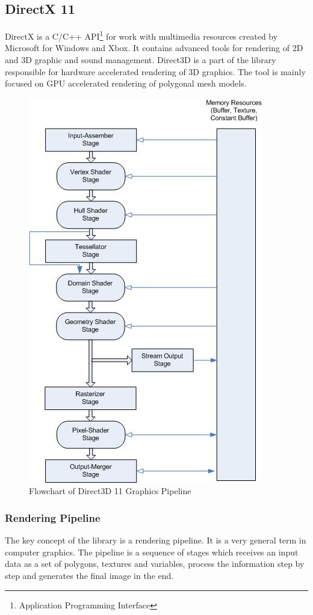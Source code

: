 \documentclass[twoside, english, 11pt]{report}
\begin{document}
\subsection{DirectX 11}
DirectX is a C/C++ API\footnote{Application Programming Interface} for work with multimedia resources created by Microsoft for Windows and Xbox. It contains advanced tools for rendering of 2D and 3D graphic and sound management. Direct3D is a part of the library responsible for hardware accelerated rendering of 3D graphics. The tool is mainly focused on GPU accelerated rendering of polygonal mesh models.\\
 \begin{figure}[!h]
\centerline{\includegraphics[scale=1]{img/pipeline}}
\caption{Flowchart of Direct3D 11 Graphics Pipeline\label{fig:pipeline}}
\end{figure}
\subsubsection{Rendering Pipeline}
The key concept of the library is a rendering pipeline. It is a very general term in computer graphics. The pipeline is a sequence of stages which receives an input data as a set of polygons, textures and variables, process the information step by step and generates the final image in the end.\\
\end{document}
